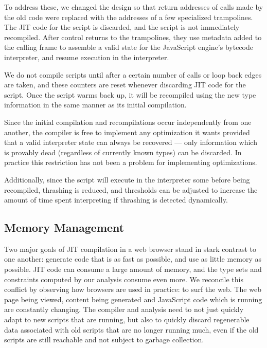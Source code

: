 To address these, we changed the design so that return addresses of
calls made by the old code were replaced with the addresses of
a few specialized trampolines.
The JIT code for the script is discarded, and the script is not
immediately recompiled.
After control returns to the trampolines, they use metadata added to
the calling frame to assemble
a valid state for the JavaScript engine's bytecode interpreter,
and resume execution in the interpreter.

We do not compile scripts until after a certain number of calls or loop back
edges are taken, and these counters are reset whenever discarding JIT code
for the script.
Once the script warms back up, it will be recompiled using the new type information
in the same manner as its initial compilation.

Since the initial compilation and recompilations occur independently
from one another, the compiler is free to implement any optimization it
wants provided that a valid interpreter state can always be recovered ---
only information which is provably dead (regardless of currently known types)
can be discarded.
In practice this restriction has not been a problem for
implementing optimizations.

Additionally, since the script will execute in the interpreter some before
being recompiled, thrashing is reduced, and thresholds can be adjusted to
increase the amount of time spent interpreting if thrashing is detected
dynamically.

\subsection{Memory Management}
\label{sec:memory}

Two major goals of JIT compilation in a web browser stand in stark contrast
to one another: generate code that is as fast as possible, and use as little
memory as possible.
JIT code can consume a large amount of memory, and the type sets and constraints
computed by our analysis consume even more.
We reconcile this conflict by observing how browsers are used in practice:
to surf the web.
The web page being viewed, content being generated and JavaScript code which
is running are constantly changing.
The compiler and analysis need to not just quickly adapt to new scripts that are
running, but also to quickly discard regenerable data associated with
old scripts that are no longer running much, even if the old scripts are still
reachable and not subject to garbage collection.

